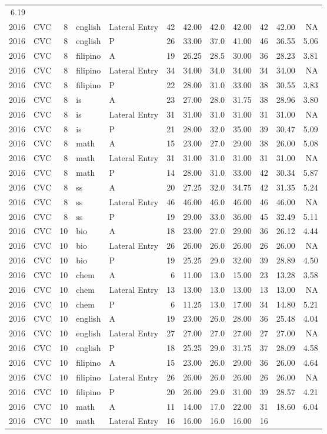 \documentclass[]{article}
\begin{document}
\begin{longtable}[]{@{}rlrllrrrrrrr@{}}
6.19\tabularnewline
2016 & CVC & 8 & english & Lateral Entry & 42 & 42.00 & 42.0 & 42.00 &
42 & 42.00 & NA\tabularnewline
2016 & CVC & 8 & english & P & 26 & 33.00 & 37.0 & 41.00 & 46 & 36.55 &
5.06\tabularnewline
2016 & CVC & 8 & filipino & A & 19 & 26.25 & 28.5 & 30.00 & 36 & 28.23 &
3.81\tabularnewline
2016 & CVC & 8 & filipino & Lateral Entry & 34 & 34.00 & 34.0 & 34.00 &
34 & 34.00 & NA\tabularnewline
2016 & CVC & 8 & filipino & P & 22 & 28.00 & 31.0 & 33.00 & 38 & 30.55 &
3.83\tabularnewline
2016 & CVC & 8 & is & A & 23 & 27.00 & 28.0 & 31.75 & 38 & 28.96 &
3.80\tabularnewline
2016 & CVC & 8 & is & Lateral Entry & 31 & 31.00 & 31.0 & 31.00 & 31 &
31.00 & NA\tabularnewline
2016 & CVC & 8 & is & P & 21 & 28.00 & 32.0 & 35.00 & 39 & 30.47 &
5.09\tabularnewline
2016 & CVC & 8 & math & A & 15 & 23.00 & 27.0 & 29.00 & 38 & 26.00 &
5.08\tabularnewline
2016 & CVC & 8 & math & Lateral Entry & 31 & 31.00 & 31.0 & 31.00 & 31 &
31.00 & NA\tabularnewline
2016 & CVC & 8 & math & P & 14 & 28.00 & 31.0 & 33.00 & 42 & 30.34 &
5.87\tabularnewline
2016 & CVC & 8 & ss & A & 20 & 27.25 & 32.0 & 34.75 & 42 & 31.35 &
5.24\tabularnewline
2016 & CVC & 8 & ss & Lateral Entry & 46 & 46.00 & 46.0 & 46.00 & 46 &
46.00 & NA\tabularnewline
2016 & CVC & 8 & ss & P & 19 & 29.00 & 33.0 & 36.00 & 45 & 32.49 &
5.11\tabularnewline
2016 & CVC & 10 & bio & A & 18 & 23.00 & 27.0 & 29.00 & 36 & 26.12 &
4.44\tabularnewline
2016 & CVC & 10 & bio & Lateral Entry & 26 & 26.00 & 26.0 & 26.00 & 26 &
26.00 & NA\tabularnewline
2016 & CVC & 10 & bio & P & 19 & 25.25 & 29.0 & 32.00 & 39 & 28.89 &
4.50\tabularnewline
2016 & CVC & 10 & chem & A & 6 & 11.00 & 13.0 & 15.00 & 23 & 13.28 &
3.58\tabularnewline
2016 & CVC & 10 & chem & Lateral Entry & 13 & 13.00 & 13.0 & 13.00 & 13
& 13.00 & NA\tabularnewline
2016 & CVC & 10 & chem & P & 6 & 11.25 & 13.0 & 17.00 & 34 & 14.80 &
5.21\tabularnewline
2016 & CVC & 10 & english & A & 19 & 23.00 & 26.0 & 28.00 & 36 & 25.48 &
4.04\tabularnewline
2016 & CVC & 10 & english & Lateral Entry & 27 & 27.00 & 27.0 & 27.00 &
27 & 27.00 & NA\tabularnewline
2016 & CVC & 10 & english & P & 18 & 25.25 & 29.0 & 31.75 & 37 & 28.09 &
4.58\tabularnewline
2016 & CVC & 10 & filipino & A & 15 & 23.00 & 26.0 & 29.00 & 36 & 26.00
& 4.64\tabularnewline
2016 & CVC & 10 & filipino & Lateral Entry & 26 & 26.00 & 26.0 & 26.00 &
26 & 26.00 & NA\tabularnewline
2016 & CVC & 10 & filipino & P & 20 & 26.00 & 29.0 & 31.00 & 39 & 28.57
& 4.21\tabularnewline
2016 & CVC & 10 & math & A & 11 & 14.00 & 17.0 & 22.00 & 31 & 18.60 &
6.04\tabularnewline
2016 & CVC & 10 & math & Lateral Entry & 16 & 16.00 & 16.0 & 16.00 & 16

\end{longtable}
\end{document}
